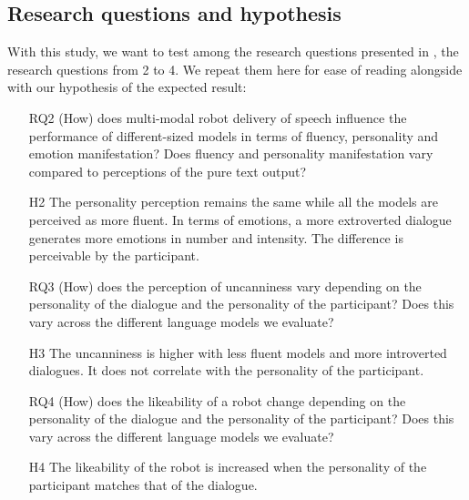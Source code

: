 \documentclass[nomenclature, english, biblatex]{kththesis}
\begin{document}
\subsection{Research questions and hypothesis}
With this study, we want to test among the research questions presented in , the research questions from 2 to 4. We repeat them here for ease of reading alongside with our hypothesis of the expected result:
\begin{itemize}
    \item[RQ2] (How) does multi-modal robot delivery of speech influence the performance of different-sized models in terms of fluency, personality and emotion manifestation? Does fluency and personality manifestation vary compared to perceptions of the pure text output?  
    \item[H2] The personality perception remains the same while all the models are perceived as more fluent. In terms of emotions, a more extroverted dialogue generates more emotions in number and intensity. The difference is perceivable by the participant.
    \item[RQ3] (How) does the perception of uncanniness vary depending on the personality of the dialogue and the personality of the participant? Does this vary across the different language models we evaluate?
    \item[H3] The uncanniness is higher with less fluent models and more introverted dialogues. It does not correlate with the personality of the participant.
    \item[RQ4] (How) does the likeability of a robot change depending on the personality of the dialogue and the personality of the participant? Does this vary across the different language models we evaluate?
    \item[H4] The likeability of the robot is increased when the personality of the participant matches that of the dialogue.
\end{itemize}
\end{document}
